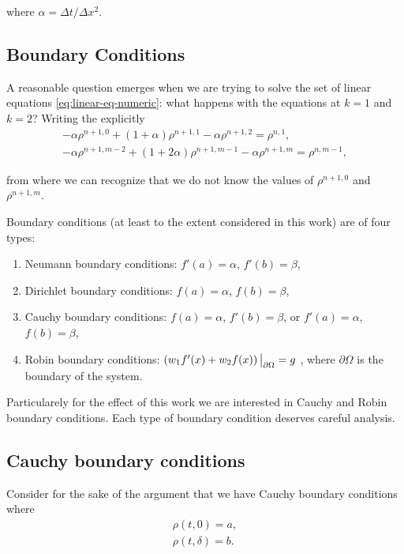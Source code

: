 where $\alpha = \Delta t / \Delta x^2$.

\subsection{Boundary Conditions}

A reasonable question emerges when we are trying to solve the set of linear equations \ref{eq:linear-eq-numeric}: what happens with the equations at $k=1$ and $k=2$? Writing the explicitly
\begin{align}
    -\alpha \rho^{n+1,0} + ( 1 + \alpha ) \rho^{n+1,1} -\alpha \rho^{n+1,2} = \rho^{n,1},\\
    -\alpha \rho^{n+1,m-2} + ( 1 + 2\alpha ) \rho^{n+1,m-1} -\alpha \rho^{n+1,m} = \rho^{n,m-1},
    \label{eq:boundary-equations1}
\end{align}

from where we can recognize that we do not know the values of $\rho^{n+1,0}$ and $\rho^{n+1,m}$.

Boundary conditions (at least to the extent considered in this work) are of four types:

\begin{enumerate}
	\item Neumann boundary conditions: $f'(a) = \alpha$, $f'(b) = \beta$,
	\item Dirichlet boundary conditions: $f(a) = \alpha$, $f(b) = \beta$,
	\item Cauchy boundary conditions: $f(a) = \alpha$, $f'(b) = \beta$, or $f'(a) = \alpha$, $f(b) = \beta$,
	\item Robin boundary conditions: $\left({w_1f'(x) + w_2f(x)}\right)\big|_{\partial\Omega} = g$ , where $\partial\Omega$ is the boundary of the system.
\end{enumerate}

Particularely for the effect of this work we are interested in Cauchy and Robin boundary conditions. Each type of boundary condition deserves careful analysis.

\subsection{Cauchy boundary conditions}
Consider for the sake of the argument that we have Cauchy boundary conditions where 
\begin{align}
	\rho(t,0) = a,\\
	\rho(t,\delta) = b.
\end{align}

